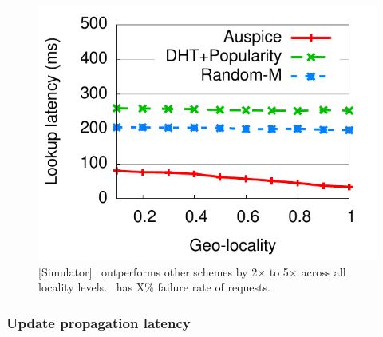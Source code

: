{\begin{figure}[t]
\begin{minipage}[b]{0.3\linewidth}
\centering
\includegraphics[scale=0.4]{auspice/graph/medianlatencyVSlocality.pdf}
\caption{[Simulator] \auspice\ outperforms other schemes by 2$\times$ to 5$\times$  across all locality levels. \replicateall\ has X\% failure rate of requests.}
\label{fig:varylocality}
\end{minipage}
\vspace{-0.15in}
\end{figure}
}
\vsp
\subsubsection{Update propagation latency}
\label{sec:updatelatency}


